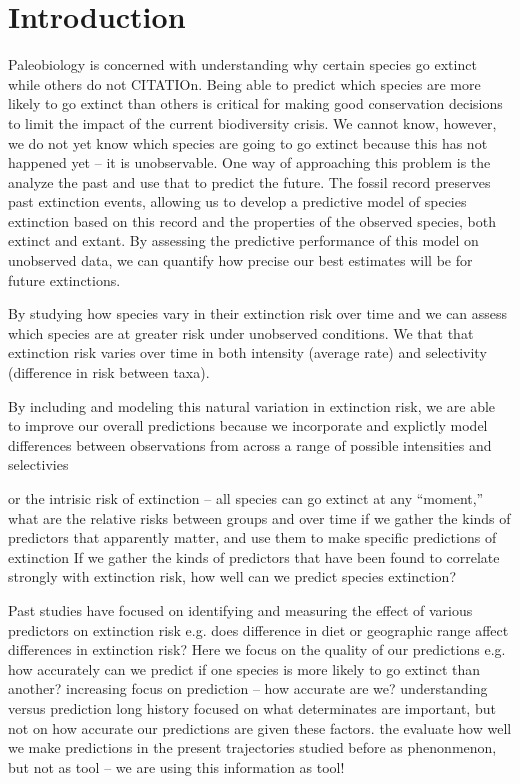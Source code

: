 \documentclass[12pt,letterpaper]{article}
\begin{document}
\section{Introduction}

Paleobiology is concerned with understanding why certain species go extinct while others do not CITATIOn. Being able to predict which species are more likely to go extinct than others is critical for making good conservation decisions to limit the impact of the current biodiversity crisis. We cannot know, however, we do not yet know which species are going to go extinct because this has not happened yet -- it is unobservable. One way of approaching this problem is the analyze the past and use that to predict the future. The fossil record preserves past extinction events, allowing us to develop a predictive model of species extinction based on this record and the properties of the observed species, both extinct and extant. By assessing the predictive performance of this model on unobserved data, we can quantify how precise our best estimates will be for future extinctions. 

By studying how species vary in their extinction risk over time and we can assess which species are at greater risk under unobserved conditions. We that that extinction risk varies over time in both intensity (average rate) and selectivity (difference in risk between taxa). 

By including and modeling this natural variation in extinction risk, we are able to improve our overall predictions because we incorporate and explictly model differences between observations from across a range of possible intensities and selectivies

or the intrisic risk of extinction -- all species can go extinct at any ``moment,'' what are the relative risks between groups and over time
if we gather the kinds of predictors that apparently matter, and use them to make specific predictions of extinction 
If we gather the kinds of predictors that have been found to correlate strongly with extinction risk, how well can we predict species extinction?



Past studies have focused on identifying and measuring the effect of various predictors on extinction risk e.g. does difference in diet or geographic range affect differences in extinction risk?
Here we focus on the quality of our predictions e.g. how accurately can we predict if one species is more likely to go extinct than another?
increasing focus on prediction -- how accurate are we?
understanding versus prediction
long history focused on what determinates are important, but not on how accurate our predictions are given these factors.
the evaluate how well we make predictions in the present
trajectories studied before as phenonmenon, but not as tool -- we are using this information as tool!
\end{document}
